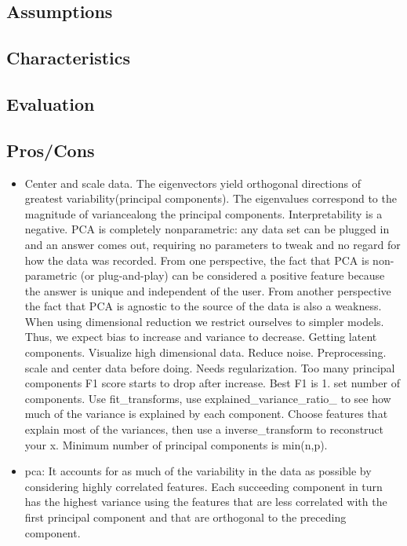 \documentclass[]{book}
\theoremstyle{definition}
\theoremstyle{definition}
\theoremstyle{definition}
\theoremstyle{remark}
\begin{document}
\subsection{Assumptions}\label{assumptions-7}

\subsection{Characteristics}\label{characteristics-2}

\subsection{Evaluation}\label{evaluation-6}

\subsection{Pros/Cons}\label{proscons-7}

\begin{itemize}
\item
  Center and scale data. The eigenvectors yield orthogonal directions of
  greatest variability(principal components). The eigenvalues correspond
  to the magnitude of variancealong the principal components.
  Interpretability is a negative. PCA is completely nonparametric: any
  data set can be plugged in and an answer comes out, requiring no
  parameters to tweak and no regard for how the data was recorded. From
  one perspective, the fact that PCA is non-parametric (or
  plug-and-play) can be considered a positive feature because the answer
  is unique and independent of the user. From another perspective the
  fact that PCA is agnostic to the source of the data is also a
  weakness. When using dimensional reduction we restrict ourselves to
  simpler models. Thus, we expect bias to increase and variance to
  decrease. Getting latent components. Visualize high dimensional data.
  Reduce noise. Preprocessing. scale and center data before doing. Needs
  regularization. Too many principal components F1 score starts to drop
  after increase. Best F1 is 1. set number of components. Use
  fit\_transforms, use explained\_variance\_ratio\_ to see how much of
  the variance is explained by each component. Choose features that
  explain most of the variances, then use a inverse\_transform to
  reconstruct your x. Minimum number of principal components is
  min(n,p).
\item
  pca: It accounts for as much of the variability in the data as
  possible by considering highly correlated features. Each succeeding
  component in turn has the highest variance using the features that are
  less correlated with the first principal component and that are
  orthogonal to the preceding component.
\end{itemize}
\end{document}
